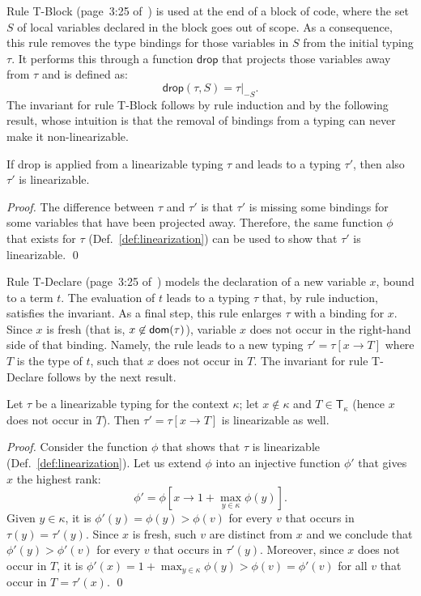 Rule \textsf{T-Block} (page~3:25 of~\cite{Pearce21}) is used at the end of a
block of code, where the set $S$ of local
variables declared in the block goes out of scope. As a consequence, this rule removes
the type bindings for those variables in $S$ from the initial typing $\tau$. It performs this
through a function $\mathsf{drop}$ that projects those variables away from $\tau$ and is defined as:
\[
\mathsf{drop}(\tau,S)=\tau|_{-S}.
\]
The invariant for rule \textsf{T-Block} follows by rule induction and by the following result,
whose intuition is that the removal of bindings from a typing can never make it
non-linearizable.
%
\begin{lemma}\label{lem:drop_invariant}
  If \textsf{drop} is applied from a linearizable typing $\tau$
  and leads to a typing $\tau'$, then also $\tau'$ is linearizable.
\end{lemma}
\begin{proof}
  The difference between $\tau$ and $\tau'$ is that $\tau'$ is missing some
  bindings for some variables that have been projected away. Therefore,
  the same function $\phi$ that exists for $\tau$ (Def.~\ref{def:linearization})
  can be used to show that $\tau'$ is linearizable.
  \qed
\end{proof}

Rule \textsf{T-Declare} (page~3:25 of~\cite{Pearce21}) models the declaration
of a new variable $x$, bound to a term $t$. The evaluation of $t$ leads to a
typing $\tau$ that, by rule induction, satisfies the invariant. As a final
step, this rule enlarges $\tau$ with a binding for $x$. Since $x$ is
fresh (that is, $x\not\in\mathsf{dom}(\tau)$),
variable $x$ does not occur in the right-hand side of that binding. Namely, the rule
leads to a new typing $\tau'=\tau[x\to T]$ where $T$ is the type of $t$, such that
$x$ does not occur in $T$. The invariant for rule \textsf{T-Declare} follows by the next result.

\begin{lemma}\label{lem:declare_invariant}
  Let $\tau$ be a linearizable typing for the context $\kappa$;
  let $x\not\in\kappa$ and $T\in\mathsf{T}_\kappa$ (hence $x$ does not occur in $T$).
  Then $\tau'=\tau[x\to T]$ is linearizable as well.
\end{lemma}
\begin{proof}
  Consider the function $\phi$ that shows that $\tau$ is linearizable (Def.~\ref{def:linearization}).
  Let us extend $\phi$ into an injective function $\phi'$ that gives $x$ the highest rank:
  \[
  \phi'=\phi\left[x\to 1+\max\limits_{y\in\kappa}\phi(y)\right].
  \]
  Given $y\in\kappa$, it is $\phi'(y)=\phi(y)>\phi(v)$ for every $v$ that occurs
  in $\tau(y)=\tau'(y)$. Since $x$ is fresh, such $v$ are distinct from $x$ and we
  conclude that $\phi'(y)>\phi'(v)$ for every $v$ that occurs in $\tau'(y)$.
  Moreover, since $x$ does not occur in $T$, it is
  $\phi'(x)=1+\max_{y\in\kappa}\phi(y)>\phi(v)=\phi'(v)$ for all $v$ that occur in $T=\tau'(x)$.
  \qed
\end{proof}

